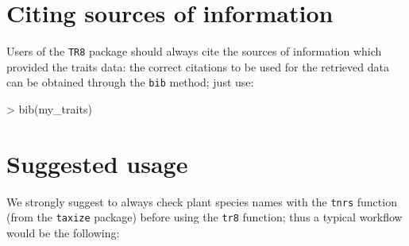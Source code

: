 \documentclass{article}
\begin{document}
\section{Citing sources of information}
\label{sec:citing}

  Users of the \texttt{TR8} package should always cite the sources of information which provided the traits data: the correct citations to be used for the retrieved data can be obtained through the \texttt{bib} method; just use:
  

\begin{Schunk}
\begin{Sinput}
> bib(my_traits)
\end{Sinput}
\end{Schunk}

  
  
 \section{Suggested usage}

  We strongly suggest to always check plant species names with the
  \texttt{tnrs} function (from the \texttt{taxize} package) before
  using the \texttt{tr8} function; thus a typical workflow would be
  the following:
  
\end{document}
